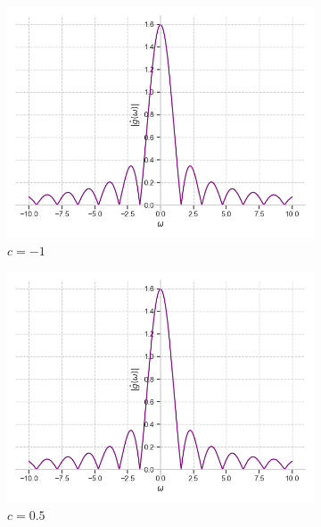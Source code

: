 \documentclass[a4paper, 16pt]{article}
\begin{document}
    \begin{figure}[htbp]
        \centering
        \begin{subfigure}{0.3\textwidth}
            \centering
            \includegraphics[width=\linewidth]{sh_m1_abs_rectf_int12.png}
            \caption{$c=-1$}
            \label{fig:absshrectf_1}
        \end{subfigure}
        \hfill
        \begin{subfigure}{0.3\textwidth}
            \centering
            \includegraphics[width=\linewidth]{sh_zp5_abs_rectf_int12.png}
            \caption{$c=0.5$}
            \label{fig:absshrectf_2}
        \end{subfigure}
        \hfill
        \begin{subfigure}{0.3\textwidth}

\end{subfigure}
\end{figure}
\end{document}
